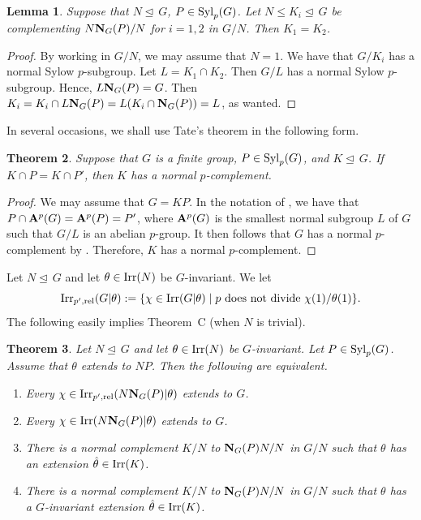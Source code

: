 \documentclass[12pt]{amsart}
\theoremstyle{plain}
\newtheorem{thm}{Theorem}[section]
\newtheorem{lem}[thm]{Lemma}
\theoremstyle{definition}
\numberwithin{equation}{section}
\def\irr#1{{\rm Irr}(#1)}
\def\irrpr#1{{\rm Irr}_{p',{\rm rel}}(#1)}
\def\syl#1#2{{\rm Syl}_#1(#2)}
\def\nor{\trianglelefteq\,}
\def\norm#1#2{{\bf N}_{#1}(#2)}
\begin{document}
\begin{lem}\label{unique}
Suppose that $N \nor G$, $P \in \syl pG$. Let $N\le K_i\nor G$ be
complementing $N\norm GP/N$ for $i=1,2$ in $G/N$. Then $K_1=K_2$.
\end{lem}

\begin{proof}
By working in $G/N$, we may assume that $N=1$.
We have that $G/K_i$ has a normal Sylow $p$-subgroup.
 Let $L=K_1 \cap K_2$. Then $G/L$ has a normal
Sylow $p$-subgroup.  Hence, $L\norm GP=G$. Then
$K_i=K_i \cap L\norm GP=L(K_i \cap \norm GP)=L$, as wanted.
\end{proof}

In several occasions, we shall use Tate's theorem in the following
form.
\begin{thm}\label{tate}
Suppose that $G$ is a finite group, $P \in \syl pG$, and $K\nor G$.
If $K\cap P=K\cap P'$, then $K$ has a normal $p$-complement.
\end{thm}

\begin{proof}
We may assume that $G=KP$. In the notation of \cite[Theorem
6.31]{Is}, we have that $P\cap {\bf A}^p(G)={\bf A}^p(P)=P'$, where
${\bf A}^p(G)$ is the smallest normal subgroup $L$ of $G$ such that
$G/L$ is an abelian $p$-group. It then follows that $G$ has a normal
$p$-complement by \cite[Theorem 6.31]{Is}. Therefore, $K$ has a
normal $p$-complement.
\end{proof}

Let $N\nor G$ and let $\theta \in \irr N$ be $G$-invariant. We let
\[\irrpr{G|\theta}:=\{ \chi \in \irr{G|\theta} \mid p \text{ does not
divide } \chi(1)/\theta(1)\}.\] The following easily implies
Theorem~C (when $N$ is trivial).

\begin{thm}\label{thmB}
Let $N\nor G$ and let $\theta \in \irr N$ be $G$-invariant. Let $P
\in \syl pG$. Assume that $\theta$ extends to $NP$. Then the
following are equivalent.
\begin{enumerate}
   \item
   Every $\chi \in {\rm Irr}_{p',{\rm rel}}(N\norm GP|\theta)$
   extends to $G$.
   \item
   Every $\chi \in {\rm Irr}(N\norm GP|\theta)$
   extends to $G$.

   \item
   There is a normal complement $K/N$
  to $\norm GP N/N$ in $G/N$ such that $\theta$ has an extension
 $\hat\theta \in \irr K$.
  \item
There is a normal complement $K/N$ to $\norm GP N/N$ in $G/N$ such
that $\theta$ has a $G$-invariant extension $\hat\theta \in \irr K$.
  \end{enumerate}
   \end{thm}
\end{document}
